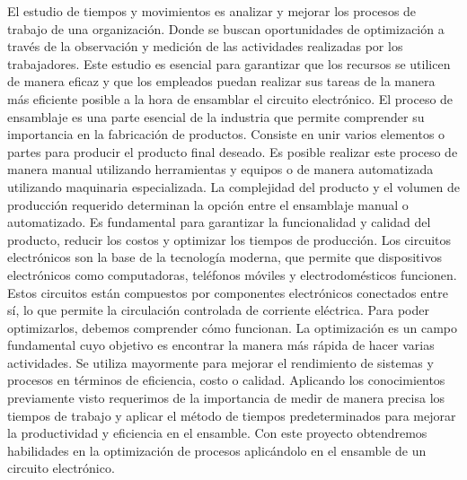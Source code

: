 El estudio de tiempos y movimientos es analizar y mejorar los procesos de trabajo de una organización. Donde se buscan oportunidades de optimización a través de la observación y medición de las actividades realizadas por los trabajadores. Este estudio es esencial para garantizar que los recursos se utilicen de manera eficaz y que los empleados puedan realizar sus tareas de la manera más eficiente posible a la hora de ensamblar el circuito electrónico.
El proceso de ensamblaje es una parte esencial de la industria que permite comprender su importancia en la fabricación de productos. Consiste en unir varios elementos o partes para producir el producto final deseado.\cite{Ensamble} Es posible realizar este proceso de manera manual utilizando herramientas y equipos o de manera automatizada utilizando maquinaria especializada. La complejidad del producto y el volumen de producción requerido determinan la opción entre el ensamblaje manual o automatizado. Es fundamental para garantizar la funcionalidad y calidad del producto, reducir los costos y optimizar los tiempos de producción.
Los circuitos electrónicos son la base de la tecnología moderna, que permite que dispositivos electrónicos como computadoras, teléfonos móviles y electrodomésticos funcionen. Estos circuitos están compuestos por componentes electrónicos conectados entre sí, lo que permite la circulación controlada de corriente eléctrica. Para poder optimizarlos, debemos comprender cómo funcionan.
La optimización es un campo fundamental cuyo objetivo es encontrar la manera más rápida de hacer varias actividades. Se utiliza mayormente para mejorar el rendimiento de sistemas y procesos en términos de eficiencia, costo o calidad.
Aplicando los conocimientos previamente visto requerimos de la importancia de medir de manera precisa los tiempos de trabajo y aplicar el método de tiempos predeterminados para mejorar la productividad y eficiencia en el ensamble.
Con este proyecto obtendremos habilidades en la optimización de procesos aplicándolo en el ensamble de un circuito electrónico. 
% 
% 
